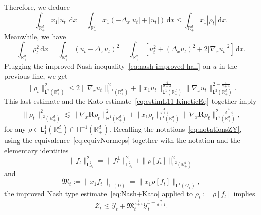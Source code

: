 \documentclass[11pt]{amsart}
\theoremstyle{definition}
\theoremstyle{remark}
\numberwithin{equation}{section}
\newcommand\R{{\mathbb R}}
\def\YY{{\mathcal Y}}
\def\ZZ{{\mathcal Z}}
\newcommand{\dd}{{\, \mathrm d}}
\newcommand{\sfL}{\mathsf{L}}
\newcommand{\sfH}{\mathsf{H}}
\begin{document}
Therefore, we deduce
\begin{equation}
  \label{eq:estimL11-KineticEq}
  \int_{\R^d_+} x_1 |u_t| \dd x = \int_{\R^d_+} x_1 \left( - \Delta_x |u_t| + |u_t| \right) \dd x \le \int_{\R^d_+} x_1 |\rho_t| \dd x.
\end{equation}
Meanwhile, we have
\begin{equation*}
  \int_{\R^d_+} \rho_t^2 \dd x = \int_{\R_+^d} \left( u_t - \Delta_x u_t \right)^2 = \int_{\R_+^d} \left[ u_t^2 + (\Delta_x u_t)^2 + 2 |\nabla_x u_t|^2 \right] \dd x.
\end{equation*}
Plugging the improved Nash inequality~\eqref{eq:nash-improved-half} on $u$ in the previous line, we get
\begin{equation*}
  \| \rho_t \|_{\sfL^{2}(\R^d_+)}^2
  \le 2 \| \nabla_x u_t \|_{\sfH^1(\R^d_+)}^2  + \| x_1 u_t \|_{\sfL^{1}(\R^d_+)} ^{\frac{4}{d+4}} \| \nabla_x u_t \|_{\sfL^{2}(\R^d_+)} ^{2-\frac{4}{d+4}}.
\end{equation*}
This last estimate and the Kato estimate~\eqref{eq:estimL11-KineticEq} together imply
\begin{align}
  \label{eq:Nash+Kato}
  \| \rho_t \|_{\sfL^{2}(\R^d_+)}^2
  \lesssim \| \nabla_x \mathbf R \rho_t \|_{\sfH^1(\R_+^d)}^2 + \|x_1 \rho_t \|_{\sfL^{1}(\R^d_+)} ^{\frac{4}{d+4}} \| \nabla_x \mathbf R \rho_t \|_{\sfL^{2}(\R^d_+)} ^{2-\frac{4}{d+4}},
\end{align}
for any $\rho \in \sfL^1_1 (\R^d_+) \cap \sfH^{-1}(\R^d_+)$.
Recalling the notations~\eqref{eq:notationsZY}, using the equivalence~\eqref{eq:equivNormeps}
together with the notation and the elementary identities
\begin{equation*}
 \| f_t \|_{\sfL^2_{\omega_1}}^2  =  \| f^\bot _t\|_{\sfL^2_{\omega_1}}^2 +  \| \rho[f_t] \|_{\sfL^{2}(\R^d_+)}^2
\end{equation*}
and
\begin{equation}
  \label{eq:def-mt}
  {\mathfrak M}_t := \| x_1 f_t \|_{\sfL^{1}(\Omega)} =
  \| x_1 \rho[f_t]\|_{\sfL^{1}(\Omega_x)},
\end{equation}
the improved Nash type estimate~\eqref{eq:Nash+Kato} applied to $\rho_t := \rho[f_t]$ implies
\begin{equation}
  \label{eq:Nash+lesautres}
  \ZZ_t \lesssim \YY_t  + \mathfrak M_t ^{\frac{4}{d+4}} \YY_t^{1-\frac{2}{d+4}}.
\end{equation}
\end{document}
